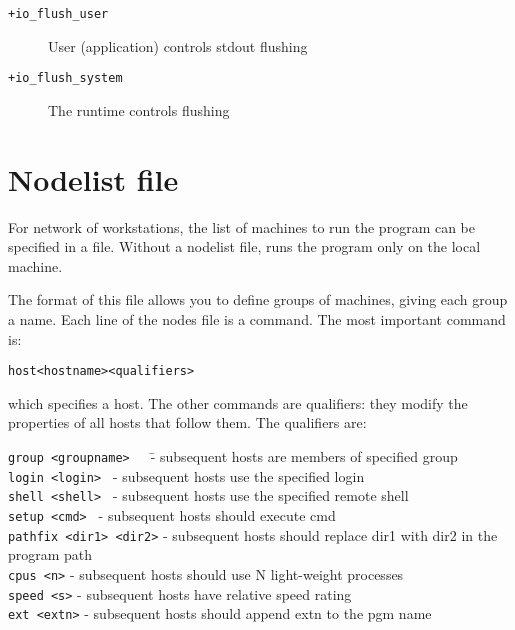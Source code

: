 \begin{description}
\item[{\tt +io\_flush\_user}]     User (application) controls stdout flushing
\item[{\tt +io\_flush\_system}]   The \charmpp{} runtime controls flushing
\end{description}


\section{Nodelist file}

For network of workstations,
the list of machines to run the program can be specified in a file.  
Without a nodelist file, \charmpp{} runs the program only on the 
local machine.

The format of this file
allows you to define groups of machines, giving each group a name.
Each line of the nodes file is a command.  The most important command
is:

\begin{alltt}
host <hostname> <qualifiers>
\end{alltt}

which specifies a host.  The other commands are qualifiers: they modify
the properties of all hosts that follow them.  The qualifiers are:


\begin{tabbing}
{\tt group <groupname>}~~~\= - subsequent hosts are members of specified group\\
{\tt login <login>  }     \> - subsequent hosts use the specified login\\
{\tt shell <shell>  }     \> - subsequent hosts use the specified remote 
shell\\
{\tt setup <cmd>  }       \> - subsequent hosts should execute cmd\\
{\tt pathfix <dir1> <dir2>}         \> - subsequent hosts should replace dir1 with dir2 in the program path\\
{\tt cpus <n>}            \> - subsequent hosts should use N light-weight processes\\
{\tt speed <s>}           \> - subsequent hosts have relative speed rating\\
{\tt ext <extn>}          \> - subsequent hosts should append extn to the pgm name\\
\end{tabbing}

